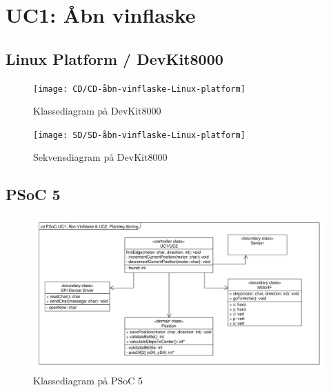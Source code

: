 \section{UC1: Åbn vinflaske}

\subsection{Linux Platform / DevKit8000}
\begin{figure}[H]
	\caption{Klassediagram  på DevKit8000}
	\label{CD:UC1-devkit}
	\texttt{[image: CD/CD-åbn-vinflaske-Linux-platform]}
\end{figure}

\begin{figure}[H]
	\caption{Sekvensdiagram  på DevKit8000}
	\label{SD:UC1-devkit}
	\texttt{[image: SD/SD-åbn-vinflaske-Linux-platform]}
\end{figure}

\subsection{PSoC 5}
\begin{figure}[H]
	\caption{Klassediagram  på PSoC 5}
	\label{CD:PSoC:UC1}
	\includegraphics[scale=0.38,trim=0 0 0 0, clip]{CD/UC1_og_UC2_CD}
\end{figure}

